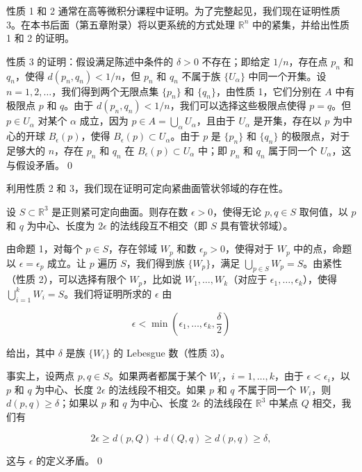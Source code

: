 性质 1 和 2 通常在高等微积分课程中证明。为了完整起见，我们现在证明性质 3。在本书后面（第五章附录）将以更系统的方式处理 $\mathbb{R}^n$ 中的紧集，并给出性质 1 和 2 的证明。

性质 3 的证明：假设满足陈述中条件的 $\delta > 0$ 不存在；即给定 $1/n$，存在点 $p_n$ 和 $q_n$，使得 $d(p_n, q_n) < 1/n$，但 $p_n$ 和 $q_n$ 不属于族 $\{U_\alpha\}$ 中同一个开集。设 $n = 1, 2, \ldots$，我们得到两个无限点集 $\{p_n\}$ 和 $\{q_n\}$，由性质 1，它们分别在 $A$ 中有极限点 $p$ 和 $q$。由于 $d(p_n, q_n) < 1/n$，我们可以选择这些极限点使得 $p = q$。但 $p \in U_\alpha$ 对某个 $\alpha$ 成立，因为 $p \in A = \bigcup_\alpha U_\alpha$，且由于 $U_\alpha$ 是开集，存在以 $p$ 为中心的开球 $B_\epsilon(p)$，使得 $B_\epsilon(p) \subset U_\alpha$。由于 $p$ 是 $\{p_n\}$ 和 $\{q_n\}$ 的极限点，对于足够大的 $n$，存在 $p_n$ 和 $q_n$ 在 $B_\epsilon(p) \subset U_\alpha$ 中；即 $p_n$ 和 $q_n$ 属于同一个 $U_\alpha$，这与假设矛盾。\qed

利用性质 2 和 3，我们现在证明可定向紧曲面管状邻域的存在性。

\begin{Proposition}[整体管状邻域]\label{prop:global-tubular-neighborhood}
设 $S \subset \mathbb{R}^3$ 是正则紧可定向曲面。则存在数 $\epsilon > 0$，使得无论 $p, q \in S$ 取何值，以 $p$ 和 $q$ 为中心、长度为 $2\epsilon$ 的法线段互不相交（即 $S$ 具有管状邻域）。
\end{Proposition}

\begin{Proof}
由命题 1，对每个 $p \in S$，存在邻域 $W_p$ 和数 $\epsilon_p > 0$，使得对于 $W_p$ 中的点，命题以 $\epsilon = \epsilon_p$ 成立。让 $p$ 遍历 $S$，我们得到族 $\{W_p\}$，满足 $\bigcup_{p \in S} W_p = S$。由紧性（性质 2），可以选择有限个 $W_p$，比如说 $W_1, \ldots, W_k$（对应于 $\epsilon_1, \ldots, \epsilon_k$），使得 $\bigcup_{i=1}^k W_i = S$。我们将证明所求的 $\epsilon$ 由

\[
\epsilon < \min\left(\epsilon_1, \ldots, \epsilon_k, \frac{\delta}{2}\right)
\]

给出，其中 $\delta$ 是族 $\{W_i\}$ 的 Lebesgue 数（性质 3）。

事实上，设两点 $p, q \in S$。如果两者都属于某个 $W_i$，$i = 1, \ldots, k$，由于 $\epsilon < \epsilon_i$，以 $p$ 和 $q$ 为中心、长度 $2\epsilon$ 的法线段不相交。如果 $p$ 和 $q$ 不属于同一个 $W_i$，则 $d(p, q) \geq \delta$；如果以 $p$ 和 $q$ 为中心、长度 $2\epsilon$ 的法线段在 $\mathbb{R}^3$ 中某点 $Q$ 相交，我们有

\[
2\epsilon \geq d(p, Q) + d(Q, q) \geq d(p, q) \geq \delta,
\]

这与 $\epsilon$ 的定义矛盾。\qed
\end{Proof}


